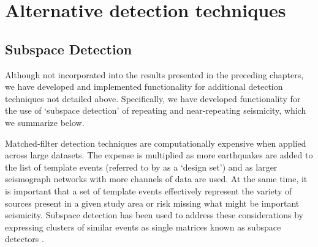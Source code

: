 \chapter{Alternative detection techniques}
\section{Subspace Detection}
Although not incorporated into the results presented in the preceding chapters, we have developed and implemented functionality for additional detection techniques not detailed above. Specifically, we have developed functionality for the use of `subspace detection' of repeating and near-repeating seismicity, which we summarize below.

Matched-filter detection techniques are computationally expensive when applied
across large datasets. The expense is multiplied as more earthquakes are added
to the list of template events (referred to by \citet{Barrett_2014} as a `design set') and as larger seismograph networks with more channels of data are used. At the same time, it is important that a set of template events effectively represent the variety of sources present in a given study area or risk missing what might be important seismicity. Subspace detection has been used to address these considerations by expressing clusters of similar events as single matrices known as subspace detectors \citep[for example][]{Harris_2006a,Harris_2006, Barrett_2014,Chambers_2015}.

